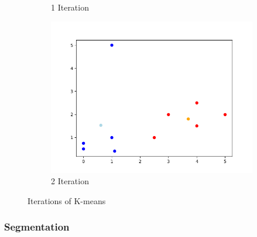\documentclass{article}
\begin{document}
\begin{figure}[H]
\begin{subfigure}{0.32\textwidth}
            \caption{1 Iteration}
            \label{fig:sub:k1}
        \end{subfigure}  
        \begin{subfigure}{0.32\textwidth}
            \centering
            \includegraphics[width=1\textwidth]{k2.png}
            \caption{2 Iteration}
            \label{fig:sub:k2}
        \end{subfigure} 
        \caption{Iterations of K-means} 
        \label{fig:kMeansIter} 
    \end{figure}
    \subsubsection{Segmentation}


\end{document}

